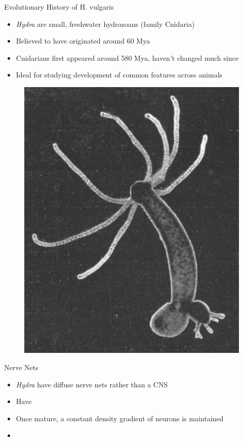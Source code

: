 \documentclass[leqno,presentation,unknownkeysallowed]{beamer}
\begin{document}
\begin{frame}{Evolutionary History of H. vulgaris}
\begin{itemize}
\item \textit{Hydra} are small, freshwater hydrozoans (family Cnidaria)
\item Believed to have originated around 60 Mya \cite{age}
\item Cnidarians first appeared around 580 Mya, haven't changed much since
\item Ideal for studying development of common features across animals
\end{itemize}
\begin{figure}
\center
\includegraphics[scale=0.20]{hydra.png}
\end{figure}
\end{frame}

\begin{frame}{Nerve Nets}
\begin{itemize}
\item \textit{Hydra} have diffuse nerve nets rather than a CNS
\item Have 
\item Once mature, a constant density gradient of neurons is maintained \cite{density}
\item 
\end{itemize}
\end{frame}
\end{document}
